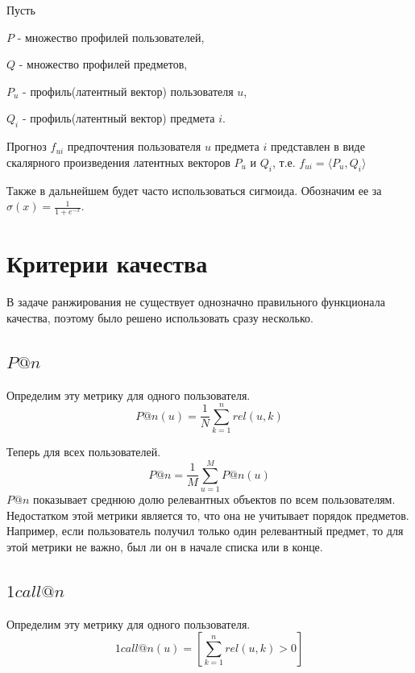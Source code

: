 \documentclass[14pt]{extarticle}
\begin{document}
Пусть  

$P$ - множество профилей пользователей, 

$Q$ - множество профилей предметов,

$P_u$ - профиль(латентный вектор) пользователя $u$,

$Q_i$ - профиль(латентный вектор) предмета $i$.

Прогноз $f_{ui}$ предпочтения пользователя $u$ предмета $i$  представлен в виде скалярного произведения латентных векторов $P_u$ и $Q_i$, т.е. $f_{ui} = \langle P_u, Q_i \rangle$

Также в дальнейшем будет часто использоваться сигмоида. Обозначим ее за $\sigma(x) = \frac{1}{1 + e^{-x}}$. 
%

\section{Критерии качества}
В задаче ранжирования не существует однозначно правильного функционала качества, поэтому было решено использовать сразу несколько.

\subsection{$P@n$}
	Определим эту метрику для одного пользователя.
	\begin{equation*}
		P@n(u) = \frac{1}{N}\sum_{k = 1}^n rel(u, k)
	\end{equation*}
	
	Теперь для всех пользователей.
	\begin{equation*}
		P@n = \frac{1}{M}\sum_{u = 1}^M P@n(u)
	\end{equation*}
	$P@n$ показывает среднюю долю релевантных объектов по всем пользователям.  Недостатком этой метрики является то, что она не учитывает порядок предметов. Например,  если пользователь получил только один релевантный предмет, то для этой метрики не важно, был ли он в начале списка или в конце. 
\subsection{$1call@n$}
	Определим эту метрику для одного пользователя.
	\begin{equation*}
		1call@n(u) = [\sum_{k = 1}^n rel(u, k) > 0]
	\end{equation*}
	
\end{document}
